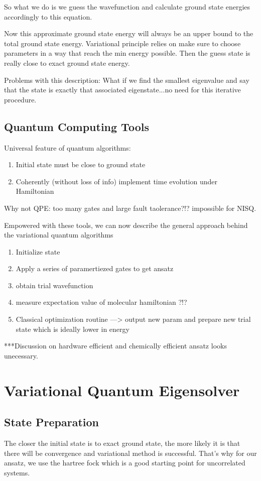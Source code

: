 \documentclass{article}
\begin{document}
So what we do is we guess the wavefunction and calculate ground state energies
accordingly to this equation.

Now this approximate ground state energy will always be an upper bound to the
total ground state energy. Variational principle relies on make sure to
choose parameters in a way that reach the min energy possible. Then the
guess state is really close to exact ground state energy.

Problems with this description: What if we find the smallest eigenvalue and say
that the state is exactly that associated eigenstate...no need for this
iterative procedure.

\subsection{Quantum Computing Tools}

Universal feature of quantum algorithms:
\begin{enumerate}
  \item Initial state must be close to ground state
  \item Coherently (without loss of info) implement time evolution under
  Hamiltonian
\end{enumerate}
Why not QPE: too many gates and large fault taolerance?!? impossible for
NISQ.

Empowered with these tools, we can now describe the general approach behind the
variational quantum algorithms
\begin{enumerate}
  \item Initialize state
  \item Apply a series of paramertiezed gates to get ansatz
  \item obtain trial wavefunction
  \item measure expectation value of molecular hamiltonian ?!?
  \item Classical optimization routine ---> output new param and prepare new
  trial state which is ideally lower in energy
\end{enumerate}

***Discussion on hardware efficient and chemically efficient ansatz looks
unecessary.

\section{Variational Quantum Eigensolver}
\subsection{State Preparation}
The closer the initial state is to exact ground state, the more likely it is
that there will be convergence and variational method is successful. That's
why for our ansatz, we use the hartree fock which is a good starting point
for uncorrelated systems.
\end{document}
